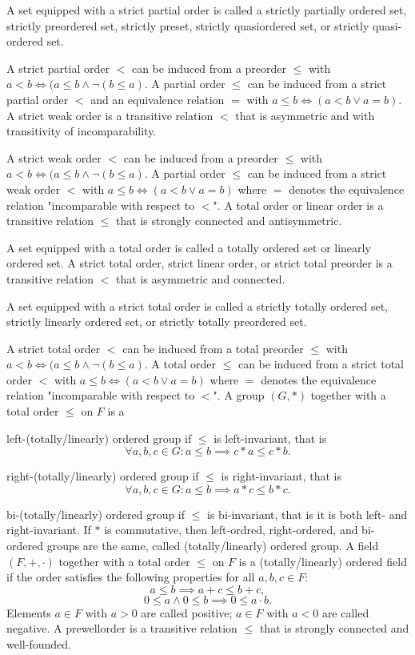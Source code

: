 \documentclass[a4paper,12pt]{article}
\begin{document}
A set equipped with a strict partial order is called a strictly partially ordered set, strictly preordered set, strictly preset, strictly quasiordered set, or strictly quasi-ordered set.

A strict partial order $<$ can be induced from a preorder $\leq$ with $a<b\iff(a\leq b\land \neg(b\leq a)$. A partial order $\leq$ can be induced from a strict partial order $<$ and an equivalence relation $=$ with $a\leq b\iff(a<b\lor a=b)$.
A strict weak order is a transitive relation $<$ that is asymmetric and with transitivity of incomparability.

A strict weak order $<$ can be induced from a preorder $\leq$ with $a<b\iff(a\leq b\land \neg(b\leq a)$. A partial order $\leq$ can be induced from a strict weak order $<$ with $a\leq b\iff(a<b\lor a=b)$ where $=$ denotes the equivalence relation "incomparable with respect to $<$".
A total order or linear order is a transitive relation $\leq$ that is strongly connected and antisymmetric.

A set equipped with a total order is called a totally ordered set or linearly ordered set.
A strict total order, strict linear order, or strict total preorder is a transitive relation $<$ that is asymmetric and connected.

A set equipped with a strict total order is called a strictly totally ordered set, strictly linearly ordered set, or strictly totally preordered set.

A strict total order $<$ can be induced from a total preorder $\leq$ with $a<b\iff(a\leq b\land \neg(b\leq a)$. A total order $\leq$ can be induced from a strict total order $<$ with $a\leq b\iff(a<b\lor a=b)$ where $=$ denotes the equivalence relation "incomparable with respect to $<$".
A group $(G,*)$ together with a total order $\leq$ on $F$ is a
\bit
\item left-(totally/linearly) ordered group if $\leq$ is left-invariant, that is
\[\forall a,b,c\in G\colon a\leq b\implies c*a\leq c*b.\]
\item right-(totally/linearly) ordered group if $\leq$ is right-invariant, that is
\[\forall a,b,c\in G\colon a\leq b\implies a*c\leq b*c.\]
\item bi-(totally/linearly) ordered group if $\leq$ is bi-invariant, that is it is both left- and right-invariant.
\eit
If $*$ is commutative, then left-ordred, right-ordered, and bi-ordered groups are the same, called (totally/linearly) ordered group.
A field $(F,+,\cdot)$ together with a total order $\leq$ on $F$ is a (totally/linearly) ordered field if the order satisfies the following properties for all $a,b,c\in F$:
\[a\leq b\implies a+c\leq b+c,\]
\[0\leq a\land 0\leq b\implies 0\leq a\cdot b.\]
Elements $a\in F$ with $a>0$ are called positive; $a\in F$ with $a<0$ are called negative.
A prewellorder is a transitive relation $\leq$ that is strongly connected and well-founded.
\end{document}
